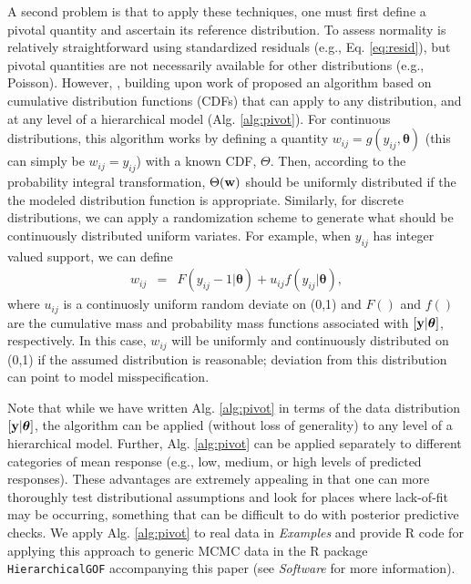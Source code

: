 \documentclass[12pt,english]{article}
\begin{document}
\begin{spacing}{1.9}
A second problem is that to apply these techniques, one must first define a pivotal quantity and ascertain its reference distribution. To assess normality is relatively straightforward using standardized residuals (e.g., Eq. \ref{eq:resid}), but pivotal quantities are not necessarily available for other distributions (e.g., Poisson).  However, \citet{YuanJohnson2012}, building upon work of \citet{Johnson2004} proposed an algorithm based on cumulative distribution functions (CDFs) that can apply to any distribution, and at any level of a hierarchical model (Alg. \ref{alg:pivot}).  For continuous distributions, this algorithm works by defining a quantity $w_{ij} = g(y_{ij},\boldsymbol{\theta})$ (this can simply be $w_{ij}=y_{ij}$) with a known CDF, $\Theta$.  Then, according to the probability integral transformation, $\Theta({\bf w})$ should be uniformly distributed if the the modeled distribution function is appropriate.  Similarly, for discrete distributions, we can apply a randomization scheme \citep{Smith1985,YuanJohnson2012} to generate what should be continuously distributed uniform variates.  For example, when $y_{ij}$ has integer valued support, we can define
\begin{eqnarray*}
  w_{ij} & = & F(y_{ij}-1|\boldsymbol{\theta}) + u_{ij} f(y_{ij}|\boldsymbol{\theta}),
\end{eqnarray*}
where $u_{ij}$ is a continuosly uniform random deviate on (0,1) and $F()$ and $f()$ are the cumulative mass and probability mass functions associated with $[{\bf y} | \boldsymbol{\theta}]$, respectively.  In this case, $w_{ij}$ will be uniformly and continuously distributed on (0,1) if the assumed distribution is reasonable; deviation from this distribution can point to model misspecification.

Note that while we have written Alg. \ref{alg:pivot} in terms of the data distribution $[{\bf y} | \boldsymbol{\theta}]$, the algorithm can be applied (without loss of generality) to any level of a hierarchical model. Further, Alg. \ref{alg:pivot} can be applied separately to different categories of mean response (e.g., low, medium, or high levels of predicted responses). These advantages are extremely appealing in that one can more thoroughly test distributional assumptions and look for places where lack-of-fit may be occurring, something that can be difficult to do with posterior predictive checks.  We apply Alg. \ref{alg:pivot} to real data in \textit{Examples} and provide R code for applying this approach to generic MCMC data in the R package \texttt{HierarchicalGOF} accompanying this paper (see \textit{Software} for more information).


\end{spacing}
\end{document}
